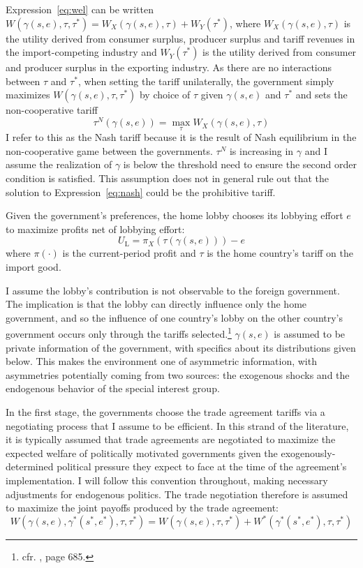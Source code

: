 \documentclass[12pt]{article}
\newcommand{\ga}{\gamma}
\begin{document}
Expression~\ref{eq:wel} can be written $W(\ga(s,e),\tau,\tau^*) = W_X(\ga(s,e),\tau) +W_Y(\tau^*)$, where $W_X(\ga(s,e),\tau)$ is the utility derived from consumer surplus, producer surplus and tariff revenues in the import-competing industry and $W_Y(\tau^*)$ is the utility derived from consumer and producer surplus in the exporting industry. As there are no interactions between $\tau$ and $\tau^*$, when setting the tariff unilaterally, the government simply maximizes $W(\ga(s,e),\tau, \tau^*)$ by choice of $\tau$ given $\ga(s,e)$ and $\tau^*$ and sets the non-cooperative tariff
\begin{equation}
  \tau^N(\ga(s,e)) = \max_\tau W_X(\ga(s,e),\tau)
  \label{eq:nash}
\end{equation}
I refer to this as the Nash tariff because it is the result of Nash equilibrium in the non-cooperative game between the governments. $\tau^N$ is increasing in $\ga$ and I assume the realization of $\ga$ is below the threshold need to ensure the second order condition is satisfied. This assumption does not in general rule out that the solution to Expression~\ref{eq:nash} could be the prohibitive tariff.

Given the government's preferences, the home lobby chooses its lobbying effort $e$ to maximize profits net of lobbying effort:
\begin{equation}
  U_\text{L} = \pi_X(\tau(\ga(s,e))) - e
  \label{eq:lv3}
\end{equation}
where $\pi(\cdot)$ is the current-period profit and $\tau$ is the home country's tariff on the import good. %

I assume the lobby's contribution is not observable to the foreign government. The implication is that the lobby can directly influence only the home government, and so the influence of one country's lobby on the other country's government occurs only through the tariffs selected.\footnote{cfr. \Textcite{gh95}, page 685.} $\ga(s,e)$ is assumed to be private information of the government, with specifics about its distributions given below. This makes the environment one of asymmetric information, with asymmetries potentially coming from two sources: the exogenous shocks and the endogenous behavior of the special interest group.

In the first stage, the governments choose the trade agreement tariffs via a negotiating process that I assume to be efficient. In this strand of the literature, it is typically assumed that trade agreements are negotiated to maximize the expected welfare of politically motivated governments given the exogenously-determined political pressure they expect to face at the time of the agreement's implementation. I will follow this convention throughout, making necessary adjustments for endogenous politics. The trade negotiation therefore is assumed to maximize the joint payoffs produced by the trade agreement:
\begin{equation}
  W(\ga(s,e),\ga^*(s^*,e^*),\tau,\tau^*) = W(\ga(s,e),\tau,\tau^*) + W^*(\ga^*(s^*,e^*),\tau,\tau^*)
  \label{eq:jv}
\end{equation}
\end{document}
